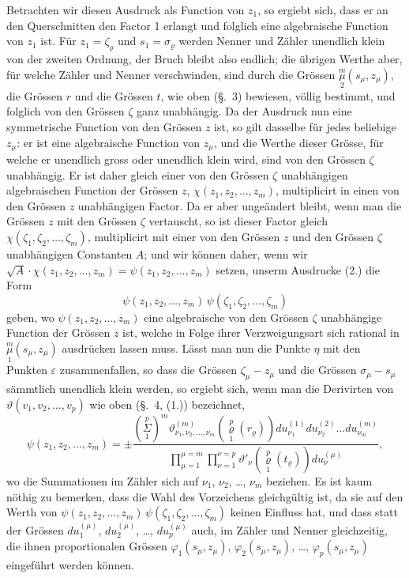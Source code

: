 \documentclass{article}
\begin{document}
Betrachten wir diesen Ausdruck als Function von $z_1$, so ergiebt sich, dass er an den Querschnitten den Factor 1 erlangt und folglich eine algebraische Function von $z_1$ ist. Für $z_1 = \zeta_\varrho$ und $s_1 = \sigma_\varrho$ werden Nenner und Zähler unendlich klein von der zweiten Ordnung, der Bruch bleibt also endlich; die übrigen Werthe aber, für welche Zähler und Nenner verschwinden, sind durch die Grössen $\overset{m}{\underset{2}{\mu}}(s_\mu, z_\mu)$, die Grössen $r$ und die Grössen $t$, wie oben (§.~3) bewiesen, völlig bestimmt, und folglich von den Grössen $\zeta$ ganz unabhängig. Da der Ausdruck nun eine symmetrische Function von den Grössen $z$ ist, so gilt dasselbe für jedes beliebige $z_\mu$: er ist eine algebraische Function von $z_\mu$, und die Werthe dieser Grösse, für welche er unendlich gross oder unendlich klein wird, sind von den Grössen $\zeta$ unabhängig. Er ist daher gleich einer von den Grössen $\zeta$ unabhängigen algebraischen Function der Grössen $z$, $\chi(z_1, z_2, \dots, z_m)$, multiplicirt in einen von den Grössen $z$ unabhängigen Factor. Da er aber ungeändert bleibt, wenn man die Grössen $z$ mit den Grössen $\zeta$ vertauscht, so ist dieser Factor gleich $\chi(\zeta_1, \zeta_2, \dots, \zeta_m)$, multiplicirt mit einer von den Grössen $z$ und den Grössen $\zeta$ unabhängigen Constanten $A$; und wir können daher, wenn wir $\sqrt{A}\cdot\chi(z_1, z_2, \dots, z_m) = \psi(z_1, z_2, \dots, z_m)$ setzen, unserm Ausdrucke (2.) die Form
\[
\tag{(3.)}
\psi(z_1, z_2, \dots, z_m)\,\psi(\zeta_1, \zeta_2, \dots, \zeta_m)
\]
geben, wo $\psi(z_1, z_2, \dots, z_m)$ eine algebraische von den Grössen $\zeta$ unabhängige Function der Grössen $z$ ist, welche in Folge ihrer Verzweigungsart sich rational in $\overset{m}{\underset{1}{\mu}}(s_\mu, z_\mu)$ ausdrücken lassen muss. Lässt man nun die Punkte $\eta$ mit den Punkten $\varepsilon$ zusammenfallen, so dass die Grössen $\zeta_\mu - z_\mu$ und die Grössen $\sigma_\mu - s_\mu$ sämmtlich unendlich klein werden, so ergiebt sich, wenn man die Derivirten
von $\vartheta(v_1, v_2, \dots, v_p)$ wie oben (§.~4, (1.)) bezeichnet,
\[
\tag{(4.)}
\psi(z_1, z_2, \dots, z_m) = \pm \frac{\left(\overset{p}{\underset{1}{\Sigma}}\right)^m \vartheta^{(m)}_{\nu_1, \nu_2, \dots, \nu_m}\left(\overset{p}{\underset{1}{\varrho}}(r_\varrho)\right) du_{\nu_1}^{(1)} du_{\nu_2}^{(2)} \dots du_{\nu_m}^{(m)}}{\displaystyle\prod_{\mu=1}^{\mu=m} \prod_{\nu=1}^{\nu=p} \vartheta'_\nu\left(\overset{p}{\underset{1}{\varrho}}(t_\varrho)\right) du_\nu^{(\mu)}},
\]
wo die Summationen im Zähler sich auf $\nu_1$, $\nu_2$, \dots, $\nu_m$ beziehen. Es ist kaum nöthig zu bemerken, dass die Wahl des Vorzeichens gleichgültig ist, da sie auf den Werth von $\psi(z_1, z_2, \dots, z_m)\,\psi(\zeta_1, \zeta_2, \dots, \zeta_m)$ keinen Einfluss hat, und dass statt der Grössen $du_1^{(\mu)}$, $du_2^{(\mu)}$, \dots, $du_p^{(\mu)}$ auch, im Zähler und Nenner gleichzeitig, die ihnen proportionalen Grössen $\varphi_1(s_\mu, z_\mu)$, $\varphi_2(s_\mu, z_\mu)$, \dots, $\varphi_p(s_\mu, z_\mu)$ eingeführt werden können.
\end{document}
